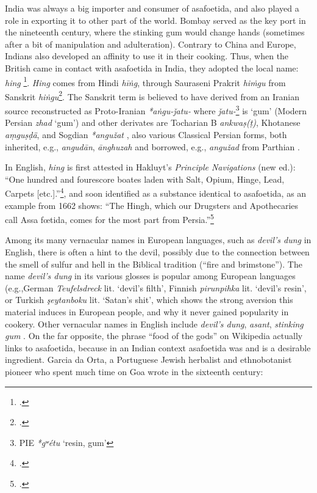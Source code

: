 

India was always a big importer and consumer of asafoetida, and also played a role in exporting it to other part of the world. Bombay served as the key port in the nineteenth century, where the stinking gum would change hands (sometimes after a bit of manipulation and adulteration). Contrary to China and Europe, Indians also developed an affinity to use it in their cooking. Thus, when the British came in contact with asafoetida in India, they adopted the local name: \textit{hing} \footcite[see][p. 418, ]{yule_hobson-jobson_1903}. \textit{Hing} comes from Hindi  
\textit{hīṅg}, through Sauraseni Prakrit \textit{hiṁgu} from Sanskrit 
\textit{hiṅgu}\footcite[hing]{ahd}. The Sanskrit term is believed to have derived from an Iranian source reconstructed as Proto-Iranian \textit{*aṅgu-ǰatu-} where \textit{ǰatu-}\footnote{\gls{PIE} \textit{*gʷétu} `resin, gum'} is `gum' (Modern Persian  \textit{zhad} `gum') and other derivates are Tocharian B \textit{ankwaṣ(ṭ)}, Khotanese \textit{a\d{m}gu\d{s}\d{d}ä}, and Sogdian \textit{*angužat} \autocites[7]{adams_dictionary_2013}[87]{gharib_sogdian_1995}[281]{turner_comparative_1962}, also various Classical Persian forms, both inherited, e.g., \textit{angudān},  \textit{ānghuzah} and borrowed, e.g., \textit{angužad} from Parthian \autocite[438]{tremblay_irano-tocharica_2005}. 

In English, \textit{hing} is first attested in Hakluyt's \textit{Principle Navigations} (new ed.): ``One hundred and fourescore boates laden with Salt, Opium, Hinge, Lead, Carpets [etc.].''\footcite[\url{http://www.perseus.tufts.edu/hopper/searchresults?target=en&inContent=true&q=hinge&doc=Perseus\%3Atext\%3A1999.03.0070}]{hakluyt_principall_1589}, and soon identified as a substance identical to asafoetida, as an example from 1662 shows: ``The Hingh, which our Drugsters and Apothecaries call Assa fœtida, comes for the most part from Persia.''\footcite[hing, \url{https://www.oed.com/view/Entry/87092}]{oed} 

Among its many vernacular names in European languages, such as \textit{devil's dung} in English, there is often a hint to the devil, possibly due to the connection between the smell of sulfur and hell in the Biblical tradition (``fire and brimstone''). The name \textit{devil's dung} in its various glosses is popular among European languages (e.g.,German \textit{Teufelsdreck} lit. `devil's filth', Finnish \textit{pirunpihka} lit. `devil's resin', or Turkish \textit{şeytanboku} lit. `Satan's shit', which shows the strong aversion this material induces in European people, and why it never gained popularity in cookery. Other vernacular names in English include \textit{devil's dung}, \textit{asant}, \textit{stinking gum} \autocite[cf.][]{george_asafoetida_2012}. On the far opposite, the phrase ``food of the gods'' on Wikipedia actually links to asafoetida, because in an Indian context asafoetida was and is a desirable ingredient. Garcia da Orta, a Portuguese Jewish herbalist and ethnobotanist pioneer who spent much time on Goa wrote in the sixteenth century:

